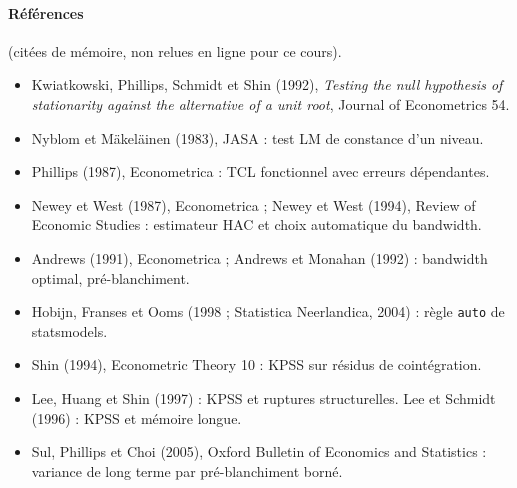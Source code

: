 \documentclass[11pt,a4paper]{article}
\newcommand{\code}[1]{\texttt{#1}}
\theoremstyle{definition}
\begin{document}
\paragraph{Références} (citées de mémoire, non relues en ligne pour ce cours).
\begin{itemize}
\item Kwiatkowski, Phillips, Schmidt et Shin (1992), \emph{Testing the null hypothesis of stationarity against the alternative of a unit root}, Journal of Econometrics 54.
\item Nyblom et Mäkeläinen (1983), JASA : test LM de constance d'un niveau.
\item Phillips (1987), Econometrica : TCL fonctionnel avec erreurs dépendantes.
\item Newey et West (1987), Econometrica ; Newey et West (1994), Review of Economic Studies : estimateur HAC et choix automatique du bandwidth.
\item Andrews (1991), Econometrica ; Andrews et Monahan (1992) : bandwidth optimal, pré-blanchiment.
\item Hobijn, Franses et Ooms (1998 ; Statistica Neerlandica, 2004) : règle \code{auto} de statsmodels.
\item Shin (1994), Econometric Theory 10 : KPSS sur résidus de cointégration.
\item Lee, Huang et Shin (1997) : KPSS et ruptures structurelles. Lee et Schmidt (1996) : KPSS et mémoire longue.
\item Sul, Phillips et Choi (2005), Oxford Bulletin of Economics and Statistics : variance de long terme par pré-blanchiment borné.
\end{itemize}
\end{document}
